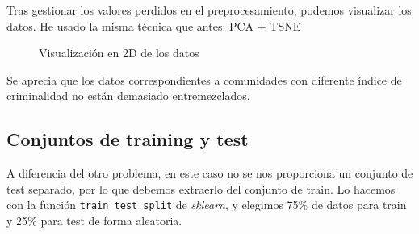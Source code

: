 \documentclass[a4]{article}
\begin{document}
Tras gestionar los valores perdidos en el preprocesamiento, podemos
visualizar los datos. He usado la misma técnica que antes: PCA + TSNE

\vspace{-4mm}
\begin{figure}[H]
  \centering
  \caption{Visualización en 2D de los datos}
  \label{fig:com_2D-projection}
\end{figure}
\vspace{-4mm}

Se aprecia que los datos correspondientes a comunidades con diferente
índice de criminalidad no están demasiado entremezclados.

\subsection{Conjuntos de training y test}

A diferencia del otro problema, en este caso no se nos proporciona un
conjunto de test separado, por lo que debemos extraerlo del conjunto
de train. Lo hacemos con la función \texttt{train\_test\_split} de
\textit{sklearn}, y elegimos 75\% de datos para train y 25\% para test
de forma aleatoria.
\end{document}
